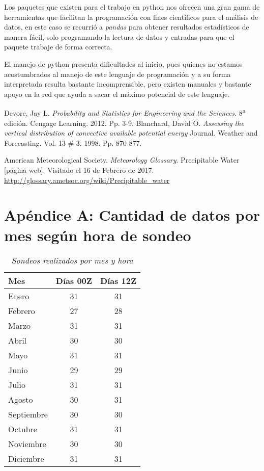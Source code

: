 Los paquetes que existen para el trabajo en python nos ofrecen una gran gama de herramientas que facilitan la programación con fines científicos para el análisis de datos, en este caso se recurrió a \textit{pandas} para obtener resultados estadísticos de manera fácil, solo programando la lectura de datos y entradas para que el paquete trabaje de forma correcta.

El manejo de python presenta dificultades al inicio, pues quienes no estamos acostumbrados al manejo de este lenguaje de programación y a su forma interpretada resulta bastante incomprensible, pero existen manuales y bastante apoyo en la red que ayuda a sacar el máximo potencial de este lenguaje.

\newpage
\begin{thebibliography}{9}

Devore, Jay L.
\textit{Probability and Statistics for Engineering and the Sciences}. 8\textsuperscript{a} edición. Cengage Learning. 2012. Pp. 3-9.
  Blanchard, David O.
 \textit{Assessing the vertical distribution of convective available potential energy} Journal. Weather and Forecasting. Vol. 13 \# 3. 1998. Pp. 870-877.

American Meteorological Society.
\textit{Meteorology Glossary}. Precipitable Water [página web]. Visitado el 16 de Febrero de 2017. 
\url{http://glossary.ametsoc.org/wiki/Precipitable_water}

\end{thebibliography}

\newpage

\section{Apéndice A: Cantidad de datos por mes según hora de sondeo}
\begin{table}[h]
\centering
\caption{\textit{Sondeos realizados por mes y hora}}
\label{fig:somesho}
\begin{tabular}{|l|c|c|}
\textbf{Mes}        & \textbf{Días 00Z} & \textbf{Días 12Z} \\ \midrule
Enero      & 31       & 31       \\
Febrero    & 27       & 28       \\
Marzo      & 31       & 31       \\
Abril      & 30       & 30       \\
Mayo       & 31       & 31       \\
Junio      & 29       & 29       \\
Julio      & 31       & 31       \\
Agosto     & 30       & 31       \\
Septiembre & 30       & 30       \\
Octubre    & 31       & 31       \\
Noviembre  & 30       & 30       \\
Diciembre  & 31       & 31      
\end{tabular}
\end{table}


